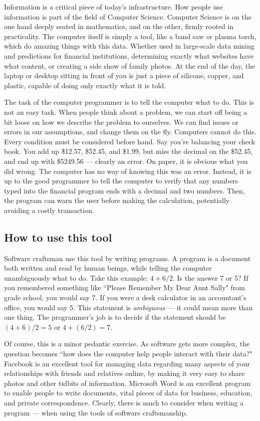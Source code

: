 Information is a critical piece of today's infrastructure. How people  use
information is part of the field of Computer Science. Computer Science is on
the one hand deeply seated in mathematics, and on the other, firmly rooted in
practicality. The computer itself is simply a tool, like a band saw or plasma
torch, which do amazing things with this data. Whether used in large-scale
data mining and predictions for financial institutions, determining exactly
what websites have what content, or creating a side show of family photos. At
the end of the day, the laptop or desktop sitting in front of you is just a
piece of silicone, copper, and plastic, capable of doing only exactly what it
is told.

The task of the computer programmer is to tell the computer what to do. This
is not an easy task. When people think about a problem, we can start off being
a bit loose on how we describe the problem to ourselves. We can find issues or
errors in our assumptions, and change them on the fly. Computers cannot do
this. Every condition must be considered before hand. Say you're balancing
your check book. You add up \$12.57, \$52.45, and \$1.99, but miss the decimal
on the \$52.45, and end up with \$5249.56 --- clearly an error. On paper, it
is obvious what you did wrong. The computer has no way of knowing this was an
error. Instead, it is up to the good programmer to tell the computer to verify
that any numbers typed into the financial program ends with a decimal and two
numbers. Then, the program can warn the user before making the calculation,
potentially avoiding a costly transaction.

\subsection{How to use this tool}

Software craftsman use this tool by writing programs. A program is a document
both written and read by human beings, while telling the computer
unambiguously what to do. Take this example: $4 + 6 / 2$. Is the answer 7 or
5? If you remembered something like ``Please Remember My Dear Aunt Sally" from
grade school, you would say 7. If you were a desk calculator in an
accountant's office, you would say 5. This statement is {\it ambiguous} --- it
could mean more than one thing. The programmer's job is to decide if the
statement should be $(4 + 6) / 2 = 5$ or $4 + (6 / 2) = 7$.

Of course, this is a minor pedantic exercise. As software gets more complex,
the question becomes ``how does the computer help people interact with their
data?" Facebook is an excellent tool for managing data regarding many aspects
of your relationships with friends and relatives online, by making it very
easy to share photos and other tidbits of information. Microsoft Word is an
excellent program to enable people to write documents, vital pieces of data
for business, education, and private correspondence. Clearly, there is much to
consider when writing a program --- when using the tools of software
craftsmanship.

